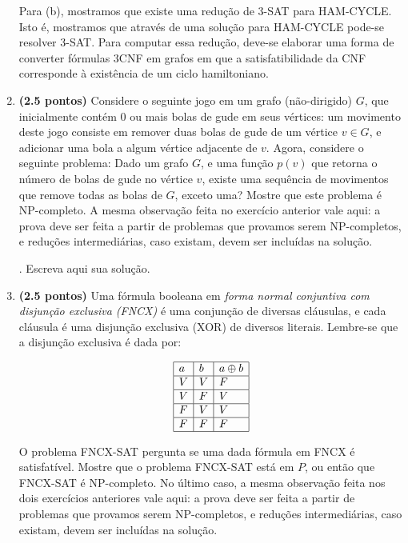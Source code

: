 \documentclass[12pt]{article}
\newcommand{\resposta}[1]{ \noindent {\bf Solução}.{\color{blue} #1}}
\begin{document}
\begin{enumerate}
{    Para (b), mostramos que existe uma redução de 3-SAT para HAM-CYCLE. Isto é, mostramos que através de uma solução para HAM-CYCLE pode-se resolver 3-SAT.    
    Para computar essa redução, deve-se elaborar uma forma de converter fórmulas 3CNF em grafos em que a satisfatibilidade da CNF corresponde à existência de um ciclo hamiltoniano. 
  }
  
\item {\bf (2.5 pontos)} Considere o seguinte jogo em um grafo
  (não-dirigido) $G$, que inicialmente contém 0 ou mais bolas de gude
  em seus vértices: um movimento deste jogo consiste em remover duas
  bolas de gude de um vértice $v\in G$, e adicionar uma bola a algum
  vértice adjacente de $v$. Agora, considere o seguinte problema: Dado
  um grafo $G$, e uma função $p(v)$ que retorna o número de bolas de
  gude no vértice $v$, existe uma sequência de movimentos que remove
  todas as bolas de $G$, exceto uma? Mostre que este problema é
  NP-completo. A mesma observação feita no exercício anterior vale
  aqui: a prova deve ser feita a partir de problemas que provamos
  serem NP-completos, e reduções intermediárias, caso existam, devem
  ser incluídas na solução.

  \resposta{
    Escreva aqui sua solução.
  }
  
\item {\bf (2.5 pontos)} Uma fórmula booleana em {\it forma normal conjuntiva com disjunção exclusiva (FNCX)} é uma conjunção de diversas cláusulas, e cada cláusula é uma disjunção exclusiva (XOR) de diversos literais. Lembre-se que a disjunção exclusiva é dada por:

  $$\begin{array}{|l|l|l|}\hline
      a & b & a \oplus b \\ \hline
      V & V & F \\ \hline
      V & F & V \\ \hline
      F & V & V \\ \hline
      F & F & F \\ \hline
  \end{array}$$

  O problema FNCX-SAT pergunta se uma dada fórmula em FNCX é
  satisfatível. Mostre que o problema FNCX-SAT está em $P$, ou então
  que FNCX-SAT é NP-completo. No último caso, a mesma observação feita
  nos dois exercícios anteriores vale aqui: a prova deve ser feita a
  partir de problemas que provamos serem NP-completos, e reduções
  intermediárias, caso existam, devem ser incluídas na solução.


\end{enumerate}
\end{document}
